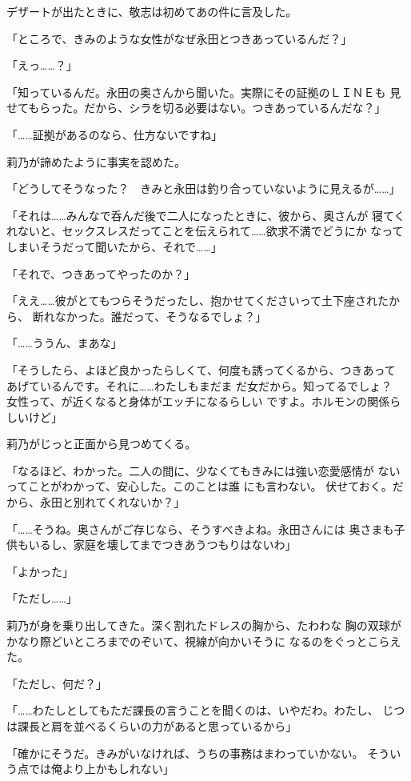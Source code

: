 ﻿\documentclass[
    book,tate,
    line_length=30zw,
    jafontsize=12pt,
    paper=b5j,
    landscape,
    ]{jlreq}
\begin{document}
デザートが出たときに、敬志は初めてあの件に言及した。

「ところで、きみのような女性がなぜ永田とつきあっているんだ？」

「えっ……？」

「知っているんだ。永田の奥さんから聞いた。実際にその証拠のＬＩＮＥも
見せてもらった。だから、シラを切る必要はない。つきあっているんだな？」

「……証拠があるのなら、仕方ないですね」

莉乃が諦めたように事実を認めた。

「どうしてそうなった？　きみと永田は釣り合っていないように見えるが……」

「それは……みんなで呑んだ後で二人になったときに、彼から、奥さんが
寝てくれないと、セックスレスだってことを伝えられて……欲求不満でどうにか
なってしまいそうだって聞いたから、それで……」

「それで、つきあってやったのか？」

「ええ……彼がとてもつらそうだったし、抱かせてくださいって土下座されたから、
断れなかった。誰だって、そうなるでしょ？」

「……ううん、まあな」

「そうしたら、よほど良かったらしくて、何度も誘ってくるから、つきあって
あげているんです。それに……わたしもまだま だ女だから。知ってるでしょ？　
女性って、が近くなると身体がエッチになるらしい
ですよ。ホルモンの関係らしいけど」

莉乃がじっと正面から見つめてくる。

「なるほど、わかった。二人の間に、少なくてもきみには強い恋愛感情が
ないってことがわかって、安心した。このことは誰 にも言わない。
伏せておく。だから、永田と別れてくれないか？」

「……そうね。奥さんがご存じなら、そうすべきよね。永田さんには
奥さまも子供もいるし、家庭を壊してまでつきあうつもりはないわ」

「よかった」

「ただし……」

莉乃が身を乗り出してきた。深く割れたドレスの胸から、たわわな
胸の双球がかなり際どいところまでのぞいて、視線が向かいそうに
なるのをぐっとこらえた。

「ただし、何だ？」

「……わたしとしてもただ課長の言うことを聞くのは、いやだわ。わたし、
じつは課長と肩を並べるくらいの力があると思っているから」

「確かにそうだ。きみがいなければ、うちの事務はまわっていかない。
そういう点では俺より上かもしれない」
\end{document}
